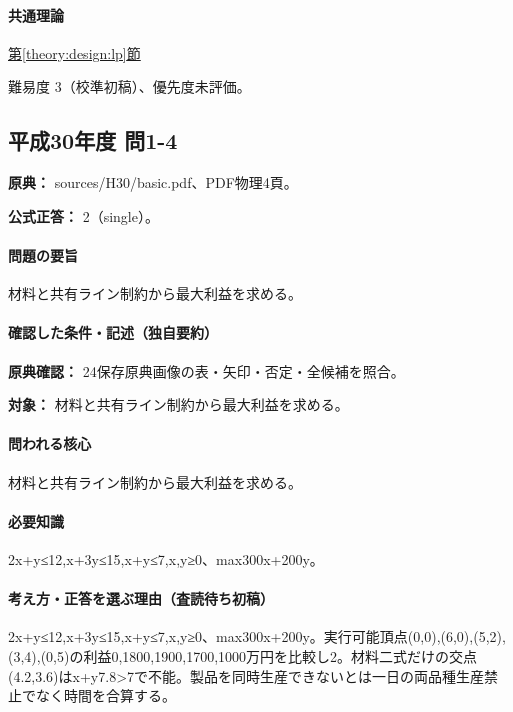 \paragraph{共通理論} \hyperref[theory:design:lp]{第\ref*{theory:design:lp}節}

\par 難易度 3（校準初稿）、優先度未評価。

\subsection{平成30年度 問1-4}
\label{q:h30-reg-basic-1-4}

\noindent\textbf{原典：} sources/H30/basic.pdf、PDF物理4頁。

\textbf{公式正答：} 2（single）。

\paragraph{問題の要旨} 材料と共有ライン制約から最大利益を求める。

\paragraph{確認した条件・記述（独自要約）}\mbox{}\par

\noindent\textbf{原典確認：} 24保存原典画像の表・矢印・否定・全候補を照合。\par

\noindent\textbf{対象：} 材料と共有ライン制約から最大利益を求める。\par

\paragraph{問われる核心} 材料と共有ライン制約から最大利益を求める。

\paragraph{必要知識} 2x+y≤12,x+3y≤15,x+y≤7,x,y≥0、max300x+200y。

\paragraph{考え方・正答を選ぶ理由（査読待ち初稿）} 2x+y≤12,x+3y≤15,x+y≤7,x,y≥0、max300x+200y。実行可能頂点(0,0),(6,0),(5,2),(3,4),(0,5)の利益0,1800,1900,1700,1000万円を比較し2。材料二式だけの交点(4.2,3.6)はx+y7.8>7で不能。製品を同時生産できないとは一日の両品種生産禁止でなく時間を合算する。

